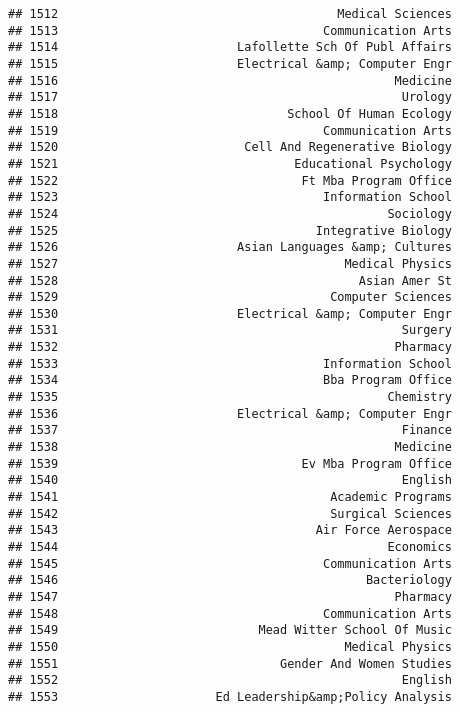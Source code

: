 \documentclass[
]{article}
\begin{document}
\begin{verbatim}
## 1512                                       Medical Sciences
## 1513                                     Communication Arts
## 1514                         Lafollette Sch Of Publ Affairs
## 1515                         Electrical &amp; Computer Engr
## 1516                                               Medicine
## 1517                                                Urology
## 1518                                School Of Human Ecology
## 1519                                     Communication Arts
## 1520                          Cell And Regenerative Biology
## 1521                                 Educational Psychology
## 1522                                  Ft Mba Program Office
## 1523                                     Information School
## 1524                                              Sociology
## 1525                                    Integrative Biology
## 1526                         Asian Languages &amp; Cultures
## 1527                                        Medical Physics
## 1528                                          Asian Amer St
## 1529                                      Computer Sciences
## 1530                         Electrical &amp; Computer Engr
## 1531                                                Surgery
## 1532                                               Pharmacy
## 1533                                     Information School
## 1534                                     Bba Program Office
## 1535                                              Chemistry
## 1536                         Electrical &amp; Computer Engr
## 1537                                                Finance
## 1538                                               Medicine
## 1539                                  Ev Mba Program Office
## 1540                                                English
## 1541                                      Academic Programs
## 1542                                      Surgical Sciences
## 1543                                    Air Force Aerospace
## 1544                                              Economics
## 1545                                     Communication Arts
## 1546                                           Bacteriology
## 1547                                               Pharmacy
## 1548                                     Communication Arts
## 1549                            Mead Witter School Of Music
## 1550                                        Medical Physics
## 1551                               Gender And Women Studies
## 1552                                                English
## 1553                      Ed Leadership&amp;Policy Analysis

\end{verbatim}
\end{document}
